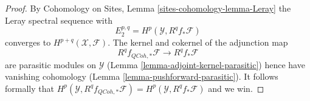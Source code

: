 \documentclass[10pt,a4paper]{amsart}
\theoremstyle{plain}
\theoremstyle{definition}
\theoremstyle{remark}
\numberwithin{equation}{subsection}
\def\QCoh{\mathit{QCoh}}
\begin{document}
\begin{proof}
By Cohomology on Sites, Lemma \ref{sites-cohomology-lemma-Leray}
the Leray spectral sequence with
$$
E_2^{p, q} = H^p(\mathcal{Y}, R^qf_*\mathcal{F})
$$
converges to $H^{p + q}(\mathcal{X}, \mathcal{F})$. The kernel and cokernel
of the adjunction map
$$
R^qf_{\QCoh, *}\mathcal{F} \longrightarrow R^qf_*\mathcal{F}
$$
are parasitic modules on $\mathcal{Y}$
(Lemma \ref{lemma-adjoint-kernel-parasitic})
hence have vanishing cohomology
(Lemma \ref{lemma-pushforward-parasitic}).
It follows formally that
$H^p(\mathcal{Y}, R^qf_{\QCoh, *}\mathcal{F}) =
H^p(\mathcal{Y}, R^qf_*\mathcal{F})$ and we win.
\end{proof}
\end{document}
